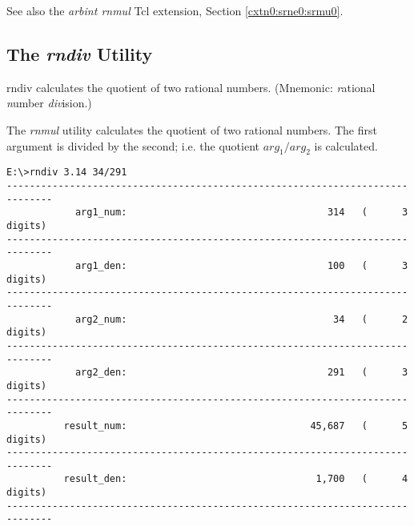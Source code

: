 \begin{dosutilcommandseealso}
See also the \emph{arbint rnmul} Tcl extension, 
Section \cxtnzeroxrefhyphen{}\ref{cxtn0:srne0:srmu0}.
\end{dosutilcommandseealso}


\subsection{The \emph{rndiv} Utility}
\label{cdcm0:srnu0:srdv0}

\begin{dosutilcommandname}{rndiv}%
calculates the quotient of two rational numbers.
(Mnemonic:  \emph{r}ational
\emph{n}umber \emph{div}ision.)
\end{dosutilcommandname}

\begin{dosutilcommandsynopsis}
\end{dosutilcommandsynopsis}

\begin{dosutilcommanddescription}
The \emph{rnmul} utility calculates the quotient
of two rational numbers.  The first argument is divided
by the second; i.e. the quotient $arg_1 / arg_2$ is calculated.
\end{dosutilcommanddescription}

\begin{dosutilcommandsampleinvocations}
\begin{scriptsize}
\begin{verbatim}
E:\>rndiv 3.14 34/291
------------------------------------------------------------------------------
            arg1_num:                                   314   (      3 digits)
------------------------------------------------------------------------------
            arg1_den:                                   100   (      3 digits)
------------------------------------------------------------------------------
            arg2_num:                                    34   (      2 digits)
------------------------------------------------------------------------------
            arg2_den:                                   291   (      3 digits)
------------------------------------------------------------------------------
          result_num:                                45,687   (      5 digits)
------------------------------------------------------------------------------
          result_den:                                 1,700   (      4 digits)
------------------------------------------------------------------------------
\end{verbatim}
\end{scriptsize}
\end{dosutilcommandsampleinvocations}

